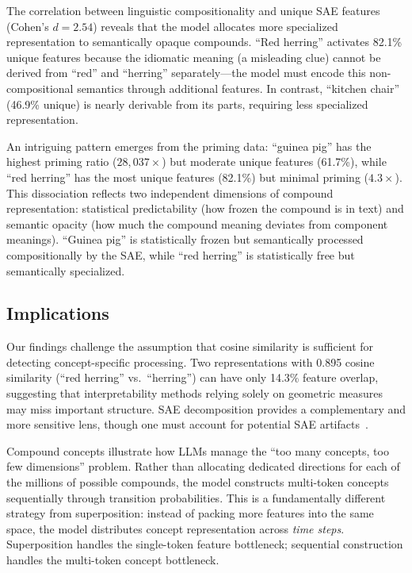 The correlation between linguistic compositionality and unique SAE features (Cohen's $d = 2.54$) reveals that the model allocates more specialized representation to semantically opaque compounds.
``Red herring'' activates 82.1\% unique features because the idiomatic meaning (a misleading clue) cannot be derived from ``red'' and ``herring'' separately---the model must encode this non-compositional semantics through additional features.
In contrast, ``kitchen chair'' (46.9\% unique) is nearly derivable from its parts, requiring less specialized representation.

An intriguing pattern emerges from the priming data: ``guinea pig'' has the highest priming ratio ($28{,}037\times$) but moderate unique features (61.7\%), while ``red herring'' has the most unique features (82.1\%) but minimal priming ($4.3\times$).
This dissociation reflects two independent dimensions of compound representation: statistical predictability (how frozen the compound is in text) and semantic opacity (how much the compound meaning deviates from component meanings).
``Guinea pig'' is statistically frozen but semantically processed compositionally by the SAE, while ``red herring'' is statistically free but semantically specialized.

\subsection{Implications}

Our findings challenge the assumption that cosine similarity is sufficient for detecting concept-specific processing.
Two representations with 0.895 cosine similarity (``red herring'' vs.\ ``herring'') can have only 14.3\% feature overlap, suggesting that interpretability methods relying solely on geometric measures may miss important structure.
SAE decomposition provides a complementary and more sensitive lens, though one must account for potential SAE artifacts~\citep{chanin2024absorption}.

Compound concepts illustrate how LLMs manage the ``too many concepts, too few dimensions'' problem.
Rather than allocating dedicated directions for each of the millions of possible compounds, the model constructs multi-token concepts sequentially through transition probabilities.
This is a fundamentally different strategy from superposition: instead of packing more features into the same space, the model distributes concept representation across \emph{time steps}.
Superposition handles the single-token feature bottleneck; sequential construction handles the multi-token concept bottleneck.

